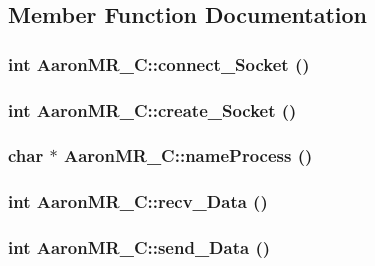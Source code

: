\subsection{Member Function Documentation}
\hypertarget{classAaronMR__C_aa43f18cd24d1da804130719312ee6d42}{
\subsubsection[{connect\_\-Socket}]{\setlength{\rightskip}{0pt plus 5cm}int AaronMR\_\-C::connect\_\-Socket ()}}
\label{classAaronMR__C_aa43f18cd24d1da804130719312ee6d42}
\hypertarget{classAaronMR__C_a80336c4d4d506e411fc87197e421a74e}{
\subsubsection[{create\_\-Socket}]{\setlength{\rightskip}{0pt plus 5cm}int AaronMR\_\-C::create\_\-Socket ()}}
\label{classAaronMR__C_a80336c4d4d506e411fc87197e421a74e}
\hypertarget{classAaronMR__C_abe83761aab74883139efa2f02646d193}{
\subsubsection[{nameProcess}]{\setlength{\rightskip}{0pt plus 5cm}char $\ast$ AaronMR\_\-C::nameProcess ()}}
\label{classAaronMR__C_abe83761aab74883139efa2f02646d193}
\hypertarget{classAaronMR__C_a010df779aa65451b26faf2c21dc09319}{
\subsubsection[{recv\_\-Data}]{\setlength{\rightskip}{0pt plus 5cm}int AaronMR\_\-C::recv\_\-Data ()}}
\label{classAaronMR__C_a010df779aa65451b26faf2c21dc09319}
\hypertarget{classAaronMR__C_ab2a5e40571d0805caab35fb44cc14031}{
\subsubsection[{send\_\-Data}]{\setlength{\rightskip}{0pt plus 5cm}int AaronMR\_\-C::send\_\-Data ()}}
\label{classAaronMR__C_ab2a5e40571d0805caab35fb44cc14031}


